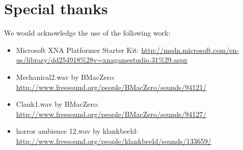 \documentclass{article}
\begin{document}
 \section{Special thanks}
 We would acknowledge the use of the following work:
 
\begin{itemize}
	\item Microsoft XNA Platformer Starter Kit: \url{http://msdn.microsoft.com/en-us/library/dd254918\%28v=xnagamestudio.31\%29.aspx}
	\item Mechanical2.wav by BMacZero: \url{http://www.freesound.org/people/BMacZero/sounds/94121/}
	\item Clank1.wav by BMacZero: \url{http://www.freesound.org/people/BMacZero/sounds/94127/}
	\item horror ambience 12.wav by klankbeeld: \url{http://www.freesound.org/people/klankbeeld/sounds/133659/}
\end{itemize}
 
\end{document}
